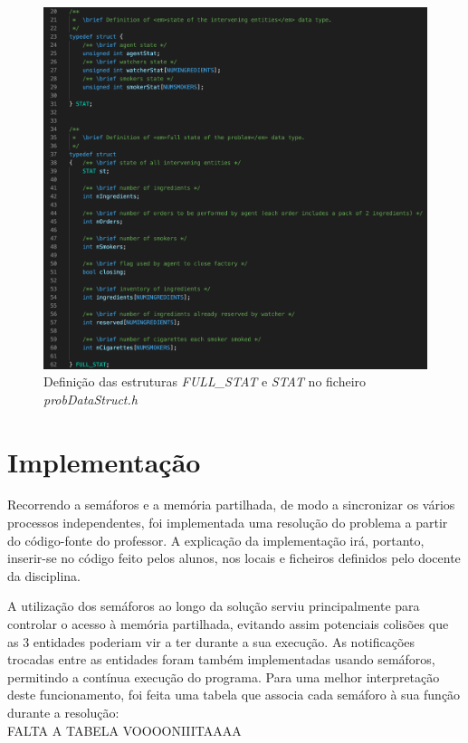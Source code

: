 \documentclass[10pt,portuguese]{article}
\begin{document}
\begin{figure}[!h]
    \centering
    \includegraphics[width=\textwidth]{images/Problem/full_stat.png}
    \caption{Definição das estruturas \textit{FULL\_STAT} e \textit{STAT} no ficheiro \textit{probDataStruct.h}}
\end{figure}

\clearpage

\section{Implementação}

\par Recorrendo a semáforos e a memória partilhada, de modo a sincronizar os vários processos independentes, foi implementada uma resolução do problema a partir do código-fonte do professor. A explicação da implementação irá, portanto, inserir-se no código feito pelos alunos, nos locais e ficheiros definidos pelo docente da disciplina. 

\par A utilização dos semáforos ao longo da solução serviu principalmente para controlar o acesso à memória partilhada, evitando assim potenciais colisões que as 3 entidades poderiam vir a ter durante a sua execução. As notificações trocadas entre as entidades foram também implementadas usando semáforos, permitindo a contínua execução do programa. Para uma melhor interpretação deste funcionamento, foi feita uma tabela que associa cada semáforo à sua função durante a resolução:\\
FALTA A TABELA VOOOONIIITAAAA
\end{document}

